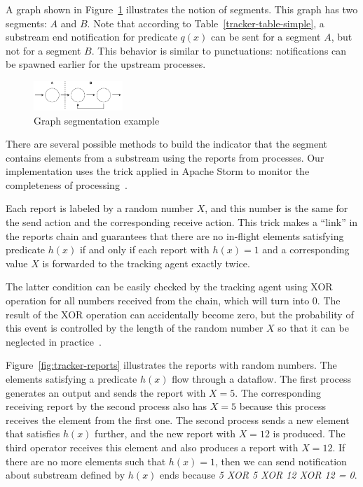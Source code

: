 A graph shown in Figure~\ref{fig:tracker-acker-comparison} illustrates the notion of segments. This graph has two segments: $A$ and $B$. Note that according to Table~\ref{tracker-table-simple}, a substream end notification for predicate $q(x)$ can be sent for a segment $A$, but not for a segment $B$. This behavior is similar to punctuations: notifications can be spawned earlier for the upstream processes.

\begin{figure}[htbp]
  \centering
  \includegraphics[width=0.3\textwidth]{pics/segments-example.pdf}
  \caption{Graph segmentation example}
  \label{fig:tracker-acker-comparison}
\end{figure}

There are several possible methods to build the indicator that the segment contains elements from a substream using the reports from processes. Our implementation uses the trick applied in Apache Storm to monitor the completeness of processing~\cite{apache:storm:acker}. 

Each report is labeled by a random number $X$, and this number is the same for the send action and the corresponding receive action. This trick makes a ``link'' in the reports chain and guarantees that there are no in-flight elements satisfying predicate $h(x)$ if and only if each report with $h(x)=1$ and a corresponding value $X$ is forwarded to the tracking agent exactly twice.

The latter condition can be easily checked by the tracking agent using XOR operation for all numbers received from the chain, which will turn into 0. The result of the XOR operation can accidentally become zero, but the probability of this event is controlled by the length of the random number $X$ so that it can be neglected in practice~\cite{apache:storm:acker}.

Figure~\ref{fig:tracker-reports} illustrates the reports with random numbers. The elements satisfying a predicate $h(x)$ flow through a dataflow. The first process generates an output and sends the report with $X=5$. The corresponding receiving report by the second process also has $X=5$ because this process receives the element from the first one. The second process sends a new element that satisfies $h(x)$ further, and the new report with $X=12$ is produced. The third operator receives this element and also produces a report with $X=12$. If there are no more elements such that $h(x)=1$, then we can send notification about substream defined by $h(x)$ ends because {\em 5 XOR 5 XOR 12 XOR 12 = 0}. 

